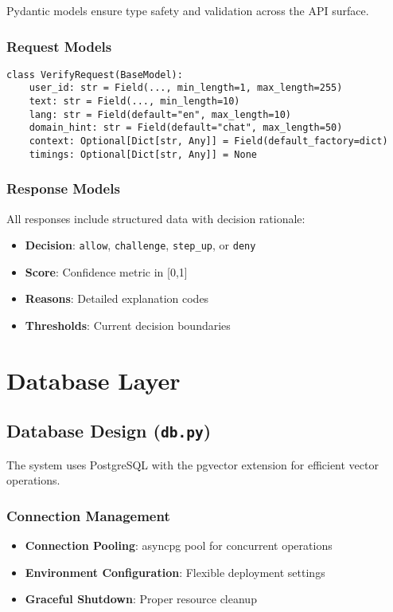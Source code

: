 \documentclass[12pt,a4paper]{article}
\begin{document}
Pydantic models ensure type safety and validation across the API surface.

\subsubsection{Request Models}
\begin{lstlisting}[caption=Verify Request Schema]
class VerifyRequest(BaseModel):
    user_id: str = Field(..., min_length=1, max_length=255)
    text: str = Field(..., min_length=10)
    lang: str = Field(default="en", max_length=10)
    domain_hint: str = Field(default="chat", max_length=50)
    context: Optional[Dict[str, Any]] = Field(default_factory=dict)
    timings: Optional[Dict[str, Any]] = None
\end{lstlisting}

\subsubsection{Response Models}
All responses include structured data with decision rationale:
\begin{itemize}
    \item \textbf{Decision}: \texttt{allow}, \texttt{challenge}, \texttt{step\_up}, or \texttt{deny}
    \item \textbf{Score}: Confidence metric in [0,1]
    \item \textbf{Reasons}: Detailed explanation codes
    \item \textbf{Thresholds}: Current decision boundaries
\end{itemize}

\section{Database Layer}

\subsection{Database Design (\texttt{db.py})}

The system uses PostgreSQL with the pgvector extension for efficient vector operations.

\subsubsection{Connection Management}
\begin{itemize}
    \item \textbf{Connection Pooling}: asyncpg pool for concurrent operations
    \item \textbf{Environment Configuration}: Flexible deployment settings
    \item \textbf{Graceful Shutdown}: Proper resource cleanup
\end{itemize}
\end{document}
